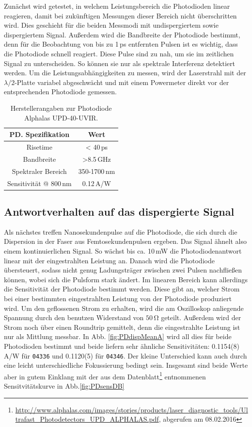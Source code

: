 \documentclass[bachelor,       %
               twoside,        %
               BCOR10mm,       %
               liststotoc,nomtotoc,bibtotoc, %
               english,ngerman, %
               final,          %
               ]{GAUBM}
\begin{document}
Zunächst wird getestet, in welchem Leistungsbereich die Photodioden linear reagieren, damit bei zukünftigen Messungen dieser Bereich nicht überschritten wird.
Dies geschieht für die beiden Messmodi mit undispergiertem sowie dispergiertem Signal.
Außerdem wird die Bandbreite der Photodiode bestimmt, denn für die Beobachtung von bis zu 1\,ps entfernten Pulsen ist es wichtig, dass die Photodiode schnell reagiert.
Diese Pulse sind zu nah, um sie im zeitlichen Signal zu unterscheiden.
So können sie nur als spektrale Interferenz detektiert werden.
Um die Leistungsabhängigkeiten zu messen, wird der Laserstrahl mit der $\lambda/2$-Platte variabel abgeschwächt und mit einem Powermeter direkt vor der entsprechenden Photodiode gemessen.

\begin{table}[!htb]
	\centering
	\begin{tabular}{|c|c|}
		\hline
		PD. Spezifikation & Wert \\		
		\hline
		Risetime & < 40\,ps \\
		Bandbreite & >8.5\,GHz \\
		Spektraler Bereich & 350-1700\,nm \\
		Sensitivität @ 800\,nm & 0.12\,A/W\\
		\hline	
	\end{tabular}
	\caption{Herstellerangaben zur Photodiode Alphalas UPD-40-UVIR.}
	\label{tab:PD}
\end{table}

\subsection{Antwortverhalten auf das dispergierte Signal}
Als nächstes treffen Nanosekundenpulse auf die Photodiode, die sich durch die Dispersion in der Faser aus Femtosekundenpulsen ergeben.
Das Signal ähnelt also einem kontinuierlichen Signal.
So wächst bis ca. 10\,mW die Photodiodenantwort linear mit der eingestrahlten Leistung an.
Danach wird die Photodiode übersteuert, sodass nicht genug Ladungsträger zwischen zwei Pulsen nachfließen können, wobei sich die Pulsform stark ändert.
Im linearen Bereich kann allerdings die Sensitivität der Photodiode bestimmt werden.
Diese gibt an, welcher Strom bei einer bestimmten eingestrahlten Leistung von der Photodiode produziert wird.
Um den geflossenen Strom zu erhalten, wird die am Oszilloskop anliegende Spannung durch den benutzen Widerstand von $50\,\si\ohm$ geteilt.
Außerdem wird der Strom noch über einen Roundtrip gemittelt, denn die eingestrahlte Leistung ist nur als Mittlung messbar.
In Abb. \ref{fig:PDdispMeanA} wird all dies für beide Photodioden bestimmt und beide liefern sehr ähnliche Sensitivitäten: 0.1154(8)\,A/W für  \texttt{04336} und  0.1120(5) für \texttt{04346}.
Der kleine Unterschied kann auch durch eine leicht unterschiedliche Fokussierung bedingt sein.
Insgesamt sind beide Werte aber in gutem Einklang mit der aus dem Datenblatt\footnote{\url{http://www.alphalas.com/images/stories/products/laser_diagnostic_tools/Ultrafast_Photodetectors_UPD_ALPHALAS.pdf}, abgerufen am 08.02.2016} entnommenen Sensitvitätskurve in Abb.\ref{fig:PDsensDB}
\end{document}
